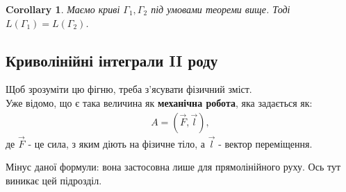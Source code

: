 \documentclass[a4paper, 10pt]{article}
\makeatletter
\def\qed{$\blacksquare$}
\theoremstyle{theoremdd}
\theoremstyle{theoremdd}
\theoremstyle{theoremdd}
\theoremstyle{theoremdd}
\theoremstyle{theoremdd}
\theoremstyle{theoremdd}
\theoremstyle{theoremdd}
\theoremstyle{theoremdd}
\theoremstyle{theoremdd}
\theoremstyle{theoremdd}
\theoremstyle{theoremdd}
\newtheorem{remark}[theorem]{Remark}
\theoremstyle{theoremdd}
\theoremstyle{theoremdd}
\theoremstyle{theoremdd}
\newtheorem{corollary}[theorem]{Corollary}
\theoremstyle{theoremdd}
\renewenvironment{proof}[1][Proof.\\]{\par
\pushQED{\hfill \qed}%
\normalfont \topsep6\p@\@plus6\p@\relax
\trivlist
\item\relax
{\bfseries
#1\@addpunct{.}}\hspace\labelsep\ignorespaces
}{%
\popQED\endtrivlist\@endpefalse
}
\newcommand\Norm[1]{\left\lVert#1\right\rVert}
\makeatother
\begin{document}
\iffalse
\begin{proof}
Покладемо $u = \phi(t)$, ми маємо $\vec{\gamma_1}(t) = \vec{\gamma_2}(\phi(t)) = \vec{\gamma_2}(u)$.\\
Відповідно звідси випливає, що\\
$\dfrac{d \vec{\gamma_1}}{dt}(t) = \dfrac{d}{dt}\left( \vec{\gamma_2}(\phi(t)) \right) = \dfrac{d \vec{\gamma_2}}{du}(u) \phi'(t)$.\\
I. Нехай $\Gamma_1 = \Gamma_2$. Значить, $\phi'(t) >0$, а тому функція $\phi$ зростає на $[a_1,b_1]$, відповідно звідси $\phi(a_1) = a_2, \phi(b_1) = b_2$. Тоді\\
$\displaystyle\int_{\Gamma_2} f\,dl = \int_{a_2}^{b_2} f(\vec{\gamma_2}(u)) \Norm{ \dfrac{d\vec{\gamma_2}}{du}(u) }\,du \overset{u = \phi(t)}{=} \int_{a_1}^{b_1} f(\vec{\gamma_2}(\phi(t))) \Norm{ \dfrac{\dfrac{d\vec{\gamma_1}}{dt}(t)}{\phi'(t)}} \cdot \phi'(t)\,dt =\\
= \int_{a_1}^{b_1} f(\vec{\gamma_1}(t)) \Norm{\dfrac{d\vec{\gamma_1}}{dt}(t)} \dfrac{\phi'(t)}{|\phi'(t)|}\,dt = \int_{a_1}^{b_1} f(\vec{\gamma_1}(t)) \Norm{ \vec{\gamma_1'}(t) }\,dt = \int_{\Gamma_1} f\,dl$.
\bigskip \\
II. Нехай $\Gamma_1 = -\Gamma_2$. Тут уже буде $\phi'(t) < 0$, а тому буде спадна функція. Тобто звідси $\phi(a_1) = b_2, \phi(b_1) = a_2$. Далі рівності, заміни аналогічні.
\end{proof}
\fi

\begin{corollary}
Маємо криві $\Gamma_1, \Gamma_2$ під умовами теореми вище. Тоді $L(\Gamma_1) = L(\Gamma_2)$.
\end{corollary}

\iffalse
\begin{remark}
У принципі, і без цієї теореми було відносно зрозуміло, що нема різниці, яка параметризація або орієнтація - все одно буде одна й та сама крива.
\end{remark}
\fi

\subsection{Криволінійні інтеграли II роду}
Щоб зрозуміти цю фігню, треба з'ясувати фізичний зміст.\\
Уже відомо, що є така величина як \textbf{механічна робота}, яка задається як:
\begin{align*}
A = (\vec{F}, \vec{l}),
\end{align*}
де $\vec{F}$ - це сила, з яким діють на фізичне тіло, а $\vec{l}$ - вектор переміщення.
\begin{figure}[H]
\centering
{}
\end{figure}
Мінус даної формули: вона застосовна лише для прямолінійного руху. Ось тут виникає цей підрозділ.
\end{document}
